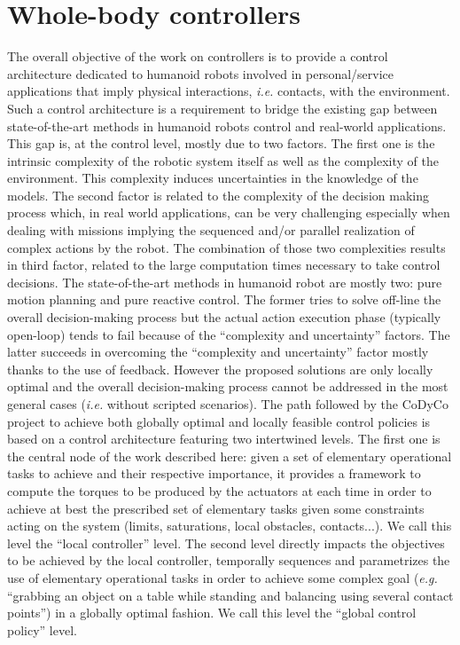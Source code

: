 \documentclass[final,5p,twocolumn]{elsarticle}
\begin{document}
\section{Whole-body controllers}

The overall objective of the work on controllers is to provide a control architecture dedicated 
to humanoid robots involved in personal/service applications that imply physical interactions,
 \textit{i.e.} contacts, with the environment. Such a control architecture is a requirement to bridge 
 the existing gap between state-of-the-art methods in humanoid robots control and real-world
applications. This gap is, at the control level, mostly due to two factors. The first one is the intrinsic 
complexity of the robotic system itself as well as the complexity of the environment. This complexity induces uncertainties in the
knowledge of the models. The second factor is related to the complexity of the decision making process which, in real world applications, can be very challenging especially when dealing with missions implying the sequenced and/or parallel realization of complex actions by the robot. The combination of those two complexities results in third factor, related to the large computation  times necessary to take control decisions.
The state-of-the-art methods in humanoid robot are mostly two: pure motion planning and pure reactive control.
 The former tries to solve off-line the overall decision-making process but the actual action execution phase (typically open-loop) tends to fail because of the ``complexity and uncertainty'' factors. The latter succeeds in overcoming the ``complexity and uncertainty'' factor mostly
thanks to the use of feedback. However the proposed solutions are only locally optimal and the overall
decision-making process cannot be addressed in the most general cases (\textit{i.e.} without scripted scenarios).
The path followed by the CoDyCo project to achieve both globally optimal and locally feasible control
policies is based on a control architecture featuring two intertwined levels. The first one is the central node of
the work described here: given a set of elementary operational tasks to achieve and their respective importance, it
provides a framework to compute the torques to be produced by the actuators at each time in order to achieve
at best the prescribed set of elementary tasks given some constraints acting on the system (limits, saturations,
local obstacles, contacts...). We call this level the ``local controller'' level. The second level directly impacts the objectives to be achieved by the local controller, temporally
sequences and parametrizes the use of elementary operational tasks in order to achieve some complex goal
(\textit{e.g.} ``grabbing an object on a table while standing and balancing using several contact points'') in a globally
optimal fashion. We call this level the ``global control policy'' level. 
\end{document}
